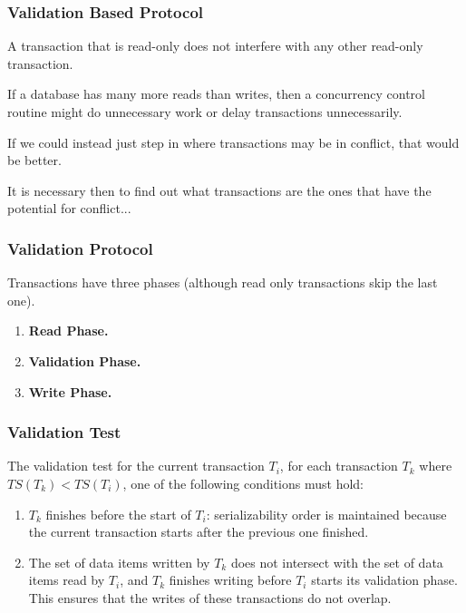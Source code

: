 \begin{frame}
\frametitle{Validation Based Protocol}

A transaction that is read-only does not interfere with any other read-only transaction. 

If a database has many more reads than writes, then a concurrency control routine might do unnecessary work or delay transactions unnecessarily.

If we could instead just step in where transactions may be in conflict, that would be better. 

It is necessary then to find out what transactions are the ones that have the potential for conflict...


\end{frame}

\begin{frame}
\frametitle{Validation Protocol}

Transactions have three phases (although read only transactions skip the last one). 

\begin{enumerate}
	\item \textbf{Read Phase.} 
	\item \textbf{Validation Phase.} 
	\item \textbf{Write Phase.} 
\end{enumerate}

\end{frame}

\begin{frame}
\frametitle{Validation Test}

The validation test for the current transaction $T_{i}$, for each transaction $T_{k}$ where $T\!S(T_{k}) < T\!S(T_{i})$, one of the following conditions must hold:

\begin{enumerate}
	\item $T_{k}$ finishes before the start of $T_{i}$: serializability order is maintained because the current transaction starts after the previous one finished.
	\item The set of data items written by $T_{k}$ does not intersect with the set of data items read by $T_{i}$, and $T_{k}$ finishes writing before $T_{i}$ starts its validation phase. This ensures that the writes of these transactions do not overlap.
\end{enumerate} 

\end{frame}

